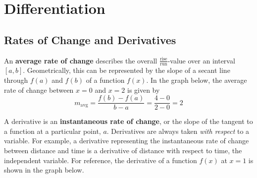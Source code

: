 \section{Differentiation}

    \subsection{Rates of Change and Derivatives}
        An \textbf{average rate of change} describes the overall
        $\frac{\text{rise}}{\text{run}}$-value over an interval $[a,b]$. Geometrically,
        this can be represented by the slope of a secant line through $f(a)$ and $f(b)$ of a
        function $f(x)$. In the graph below, the average rate of change between $x=0$ and
        $x=2$ is given by \\

        \begin{equation*}
            m_{\text{avg}} = \frac{f(b)-f(a)}{b-a} = \frac{4-0}{2-0} = 2
        \end{equation*}

        \begin{center}
        \end{center}

        \noindent A derivative is an \textbf{instantaneous rate of change}, or the slope of the
        tangent to a function at a particular point, $a$. Derivatives are always taken
        \textit{with respect} to a variable. For example, a derivative representing the
        instantaneous rate of change between distance and time is a derivative of distance
        with respect to time, the independent variable. For reference, the derivative of a
        function $f(x)$ at $x=1$ is shown in the graph below. \\

